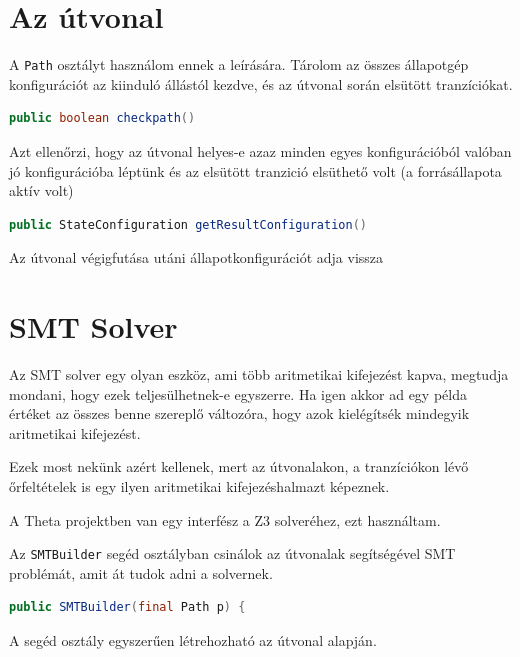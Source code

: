 \section{Az útvonal}
A \verb+Path+ osztályt használom ennek a leírására. Tárolom az összes állapotgép konfigurációt az kiinduló állástól kezdve, és az útvonal során elsütött tranzíciókat.


\begin{lstlisting}[language=java,breaklines=true]
public boolean checkpath()
\end{lstlisting}

Azt ellenőrzi, hogy az útvonal helyes-e azaz minden egyes konfigurációból valóban jó konfigurációba léptünk és az elsütött tranzició elsüthető volt (a forrásállapota aktív volt)

\begin{lstlisting}[language=java,breaklines=true]
public StateConfiguration getResultConfiguration()
\end{lstlisting}

Az útvonal végigfutása utáni állapotkonfigurációt adja vissza


\section{SMT Solver}
Az SMT solver egy olyan eszköz, ami több aritmetikai kifejezést kapva, megtudja mondani, hogy ezek teljesülhetnek-e egyszerre. Ha igen akkor ad egy példa értéket az összes benne szereplő változóra, hogy azok kielégítsék mindegyik aritmetikai kifejezést.

Ezek most nekünk azért kellenek, mert az útvonalakon, a tranzíciókon lévő őrfeltételek is egy ilyen aritmetikai kifejezéshalmazt képeznek. 

A Theta projektben van egy interfész a Z3 solveréhez, ezt használtam.

Az \verb+SMTBuilder+ segéd osztályban csinálok az útvonalak segítségével SMT problémát, amit át tudok adni a solvernek.

\begin{lstlisting}[language=java,breaklines=true]
public SMTBuilder(final Path p) {
\end{lstlisting}
A segéd osztály egyszerűen létrehozható az útvonal alapján.


